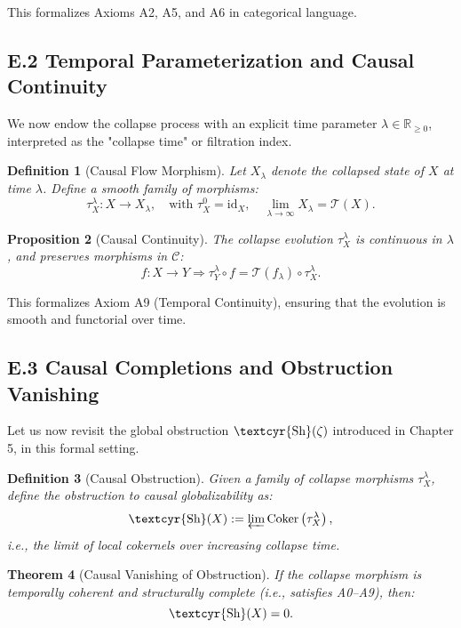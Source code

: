 \documentclass[11pt]{article}
\newtheorem{theorem}{Theorem}[section]
\newtheorem{definition}[theorem]{Definition}
\newtheorem{proposition}[theorem]{Proposition}
\newcommand{\Sha}{\text{\textcyr{Sh}}}
\begin{document}
This formalizes Axioms A2, A5, and A6 in categorical language.

\subsection*{E.2 Temporal Parameterization and Causal Continuity}

We now endow the collapse process with an explicit time parameter $\lambda \in \mathbb{R}_{\geq 0}$,  
interpreted as the "collapse time" or filtration index.

\begin{definition}[Causal Flow Morphism]
Let $X_\lambda$ denote the collapsed state of $X$ at time $\lambda$.  
Define a smooth family of morphisms:
\[
\tau^\lambda_X : X \to X_\lambda, \quad \text{with } \tau^0_X = \text{id}_X, \quad \lim_{\lambda \to \infty} X_\lambda = \mathcal{T}(X).
\]
\end{definition}

\begin{proposition}[Causal Continuity]
The collapse evolution $\tau^\lambda_X$ is continuous in $\lambda$, and preserves morphisms in $\mathcal{C}$:
\[
f : X \to Y \Rightarrow \tau^\lambda_Y \circ f = \mathcal{T}(f_\lambda) \circ \tau^\lambda_X.
\]
\end{proposition}

This formalizes Axiom A9 (Temporal Continuity), ensuring that the evolution is smooth and functorial over time.

\subsection*{E.3 Causal Completions and Obstruction Vanishing}

Let us now revisit the global obstruction $\Sha(\zeta)$ introduced in Chapter 5, in this formal setting.

\begin{definition}[Causal Obstruction]
Given a family of collapse morphisms $\tau^\lambda_X$, define the obstruction to causal globalizability as:
\[
\Sha(X) := \varprojlim \mathrm{Coker}\left( \tau^\lambda_X \right),
\]
i.e., the limit of local cokernels over increasing collapse time.
\end{definition}

\begin{theorem}[Causal Vanishing of Obstruction]
If the collapse morphism is temporally coherent and structurally complete (i.e., satisfies A0–A9), then:
\[
\Sha(X) = 0.
\]
\end{theorem}
\end{document}
